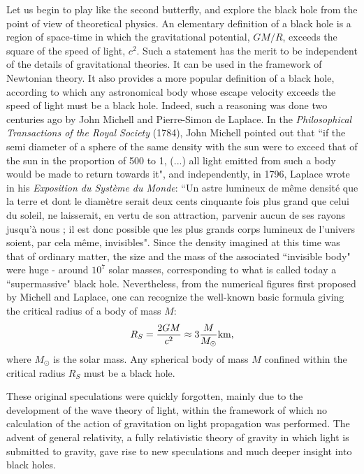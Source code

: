 \documentclass{lamuphys}
\begin{document}
Let us begin to play like the second butterfly, and explore the black hole 
from  the point of view of theoretical physics.
An elementary definition of a black hole is a region of space-time in which
the gravitational potential, $GM/R$, exceeds the square of the speed of light,
$c^2$. Such a statement has the merit to be independent of the details of
gravitational theories. It can be used in the framework of Newtonian
theory. It also provides a more popular definition of a black
hole, according to which any astronomical body whose
escape velocity exceeds the speed of light must be a black hole.
Indeed, such a reasoning was done two centuries ago
by John Michell and Pierre-Simon de Laplace. In the {\it Philosophical
Transactions of the Royal Society} (1784), John Michell pointed out that ``if
the semi diameter of a sphere of the same density with the sun were to exceed
that of the sun in the proportion of 500 to 1, (...) all light emitted from
such a body would be made to return towards it", and independently, in 1796,
Laplace wrote in his {\it Exposition du Syst\`eme du Monde}: ``Un astre
lumineux de m\^eme densit\'e que la terre et dont le diam\`etre serait deux cents
cinquante fois plus grand que celui du soleil, ne laisserait, en vertu de son
attraction, parvenir aucun de ses rayons jusqu'\`a nous ; il est donc possible
que les plus grands corps lumineux de l'univers soient, par cela m\^eme,
invisibles".  Since the density imagined at this time was that of ordinary
matter, the size and the mass of the associated ``invisible body" were huge -
around $10^7$ solar masses, corresponding to what is called today a
``supermassive" black hole. Nevertheless, from the numerical figures first
proposed by Michell and Laplace, one can recognize the well-known basic
formula giving the critical radius of a body of mass $M$: 
\begin{equation}
R_S = {2 GM\over c^2} \approx 3 {M\over M_{\odot}} \textrm{km},     
\end{equation}
where $M_{\odot}$ is the solar mass. Any spherical body of mass $M$ confined 
within the critical radius $R_{S}$ must be a black hole.
 
These original speculations were quickly forgotten, mainly due to the
development of the wave theory of light, within the framework of which no
calculation of the action of gravitation on light propagation was performed.
The advent of general relativity, a fully relativistic
theory of gravity in which light is submitted to gravity, gave rise to new
speculations and much deeper insight into black holes.
\end{document}
